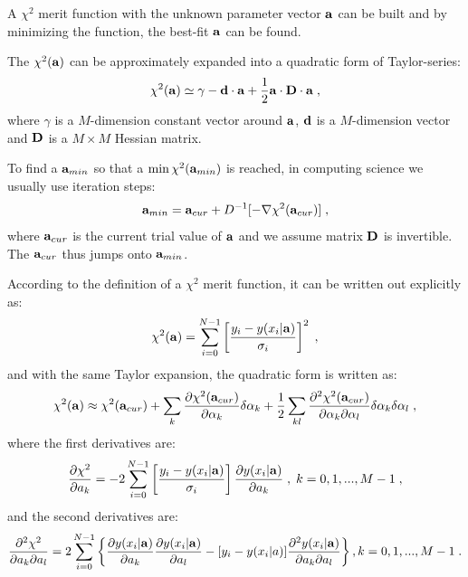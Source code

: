 A $\chi^2$ merit function with the unknown parameter vector $\bf a$ can be built and by minimizing the function, the best-fit $\bf a$ can be found.

The $\chi^2(\bf a)$ can be approximately expanded into a quadratic form of Taylor-series:
\begin{equation} \label{eq:1}
\chi^2({\bf a})\simeq \gamma-{\bf d\cdot a}+\frac{1}{2}{\bf a\cdot D\cdot a} \; ,
\end{equation}
where $\gamma$ is a $M$-dimension constant vector around $\bf a$, $\bf d$ is a $M$-dimension vector and $\bf D$ is a $M\times M$ Hessian matrix.

To find a ${\bf a}_{min}$ so that a $\min\chi^2({\bf a}_{min})$ is reached, in computing science we usually use iteration steps: 
\begin{equation} \label{eq:2}{\bf a}_{min}={\bf a}_{cur}+D^{-1}[-\nabla\chi^2({\bf a}_{cur})] \; ,
\end{equation} 
where ${\bf a}_{cur}$ is the current trial value of $\bf a$ and we assume matrix $\bf D$ is invertible. The ${\bf a}_{cur}$ thus jumps onto ${\bf a}_{min}$.

According to the definition of a $\chi^2$ merit function, it can be written out explicitly as:
\begin{equation}
\chi^2({\bf a})=\sum_{i=0}^{N-1}\left[\frac{y_i-y(x_i|{\bf a})}{\sigma_i}\right]^2 \; ,
\end{equation}
and with the same Taylor expansion, the quadratic form is written as:
\begin{equation}\label{eq:3}
\chi^2({\bf a})\approx\chi^2({\bf a}_{cur})+\sum_k\frac{\partial \chi^2({\bf a}_{cur})}{\partial \alpha_k}\delta\alpha_k+\frac{1}{2}\sum_{kl}\frac{\partial^2\chi^2({\bf a}_{cur})}{\partial\alpha_k\partial\alpha_l}\delta\alpha_k\delta\alpha_l \; , 
\end{equation}
where the first derivatives are:
\begin{equation}\label{eq:4}
\frac{\partial \chi^2}{\partial a_k}=-2\sum_{i=0}^{N-1}\left[\frac{y_i-y(x_i|{\bf a})}{\sigma_i}\right]\frac{\partial y(x_i|{\bf a})}{\partial a_k}\; ,\; k = 0,1,...,M-1 \; ,
\end{equation}
and the second derivatives are:
\begin{equation}\label{eq:5}
\frac{\partial^2 \chi^2}{\partial a_k\partial a_l}=2\sum_{i=0}^{N-1}\left\{\frac{\partial y(x_i|{\bf a})}{\partial a_k}\frac{\partial y(x_i|{\bf a})}{\partial a_l}-[y_i-y(x_i|a)]\frac{\partial^2 y(x_i|{\bf a})}{\partial a_k\partial a_l}\right\}, k = 0, 1, ..., M-1 \;.
\end{equation}

